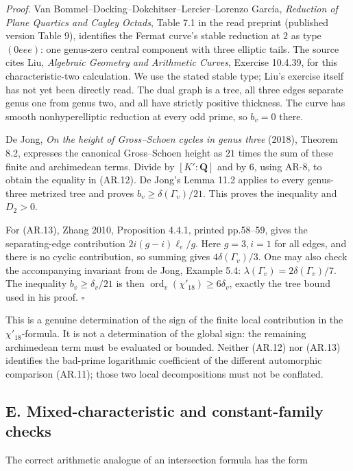 \documentclass[11pt,a4paper]{article}
\begin{document}
\emph{Proof.} Van Bommel--Docking--Dokchitser--Lercier--Lorenzo García,
\emph{Reduction of Plane Quartics and Cayley Octads}, Table 7.1 in the
read preprint (published version Table 9), identifies the Fermat curve's
stable reduction at \(2\) as type \((0eee)\): one genus-zero central
component with three elliptic tails. The source cites Liu,
\emph{Algebraic Geometry and Arithmetic Curves}, Exercise 10.4.39, for
this characteristic-two calculation. We use the stated stable type;
Liu's exercise itself has not yet been directly read. The dual graph is
a tree, all three edges separate genus one from genus two, and all have
strictly positive thickness. The curve has smooth nonhyperelliptic
reduction at every odd prime, so \(b_v=0\) there.

De Jong, \emph{On the height of Gross--Schoen cycles in genus three}
(2018), Theorem 8.2, expresses the canonical Gross--Schoen height as
\(21\) times the sum of these finite and archimedean terms. Divide by
\([K':\mathbf Q]\) and by \(6\), using AR-8, to obtain the equality in
(AR.12). De Jong's Lemma 11.2 applies to every genus-three metrized tree
and proves \(b_v\ge\delta(\Gamma_v)/21\). This proves the inequality and
\(D_2>0\).

For (AR.13), Zhang 2010, Proposition 4.4.1, printed pp.58--59, gives the
separating-edge contribution \(2i(g-i)\ell_e/g\). Here \(g=3,i=1\) for
all edges, and there is no cyclic contribution, so summing gives
\(4\delta(\Gamma_v)/3\). One may also check the accompanying invariant
from de Jong, Example 5.4: \(\lambda(\Gamma_v)=2\delta(\Gamma_v)/7\).
The inequality \(b_v\ge\delta_v/21\) is then
\(\operatorname{ord}_v(\chi'_{18})\ge6\delta_v\), exactly the tree bound
used in his proof. \(\square\)

This is a genuine determination of the sign of the finite local
contribution in the \(\chi'_{18}\)-formula. It is not a determination of
the global sign: the remaining archimedean term must be evaluated or
bounded. Neither (AR.12) nor (AR.13) identifies the bad-prime
logarithmic coefficient of the different automorphic comparison (AR.11);
those two local decompositions must not be conflated.

\subsection{E. Mixed-characteristic and constant-family
checks}\label{e.-mixed-characteristic-and-constant-family-checks}

The correct arithmetic analogue of an intersection formula has the form
\end{document}
